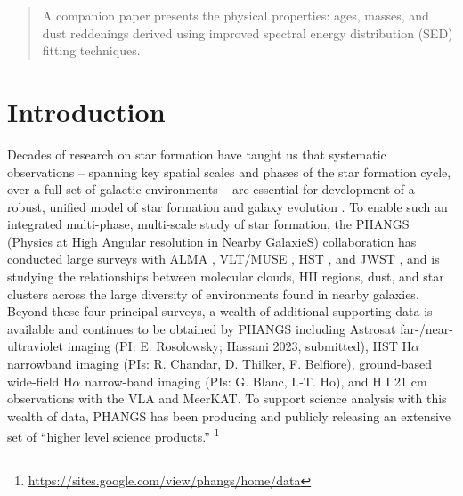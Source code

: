 \documentclass[linenumbers]{aastex63}
\begin{document}
\begin{abstract}
A companion paper presents the physical properties: ages, masses, and dust reddenings derived using improved spectral energy distribution (SED) fitting techniques.
\end{abstract}


\section{Introduction}\label{sec:intro}
Decades of research on star formation have taught us that systematic observations – spanning key spatial scales and phases of the star formation cycle, over a full set of galactic environments – are essential for development of a robust, unified model of star formation and galaxy evolution \citep[e.g.][]{kennicutt_star_2012}.  To enable such an integrated multi-phase, multi-scale study of star formation, the PHANGS (Physics at High Angular resolution in Nearby GalaxieS) collaboration \citep{schinnerer_physics_2019} has conducted large surveys with ALMA \citep{leroy_phangs-alma_2021}, VLT/MUSE \citep{emsellem_phangs-muse_2022}, HST \citep{lee_phangs-hst_2022}, and JWST \citep{lee_phangs-jwst_2023}, and is studying the relationships between molecular clouds, HII regions, dust, and star clusters across the large diversity of environments found in nearby galaxies. Beyond these four principal surveys, a wealth of additional supporting data is available and continues to be obtained by PHANGS including Astrosat far-/near-ultraviolet imaging (PI: E. Rosolowsky; Hassani 2023, submitted), HST H$\alpha$ narrowband imaging (PIs: R. Chandar, D. Thilker, F. Belfiore), ground-based wide-field H$\alpha$ narrow-band imaging (PIs: G. Blanc, I.-T. Ho), and H I 21 cm observations with the VLA and MeerKAT.  To support science analysis with this wealth of data, %
PHANGS has been producing and publicly releasing
an extensive set of ``higher level science products.'' \footnote{\url{https://sites.google.com/view/phangs/home/data}}
\end{document}
